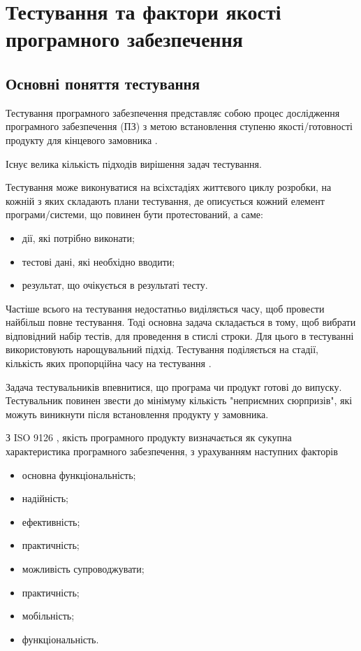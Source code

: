 \section{Тестування та фактори якості програмного забезпечення}

\subsection{Основні поняття тестування}

Тестування програмного забезпечення представляє собою процес
дослідження програмного забезпечення (ПЗ) з метою встановлення
ступеню якості/готовності продукту для кінцевого замовника 
\cite{os-development,scrum-book,testing-black}.

Існує велика кількість підходів вирішення задач тестування.

Тестування може виконуватися на всіхстадіях життєвого циклу розробки,
на кожній з яких складають плани тестування, де описується кожний
елемент програми/системи, що повинен бути протестований, а саме:

\begin{itemize}
    \item дії, які потрібно виконати;
    \item тестові дані, які необхідно вводити;
    \item результат, що очікується в результаті тесту.
\end{itemize}

Частіше всього на тестування недостатньо виділяється часу,
щоб провести найбільш повне тестування. Тоді основна задача складається
в тому, щоб вибрати відповідний набір тестів, для проведення в
стислі строки. Для цього в тестуванні використовують
нарощувальний підхід. Тестування поділяється на стадії,
кількість яких пропорційна часу на тестування 
\cite{testing-black,test-automation-article}.

Задача тестувальників впевнитися, що програма чи продукт готові до випуску.
Тестувальник повинен звести до мінімуму кількість "неприємних сюрпризів",
які можуть виникнути після встановлення продукту у замовника.

З ISO 9126 \cite{iso-software-eng}, якість програмного продукту визначається як сукупна
характеристика програмного забезпечення, з урахуванням наступних факторів

\begin{itemize}
    \item основна функціональність;
    \item надійність;
    \item ефективність;
    \item практичність;
    \item можливість супроводжувати;
    \item практичність;
    \item мобільність;
    \item функціональність.
\end{itemize}

